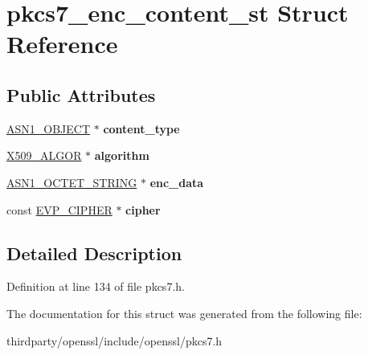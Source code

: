 \hypertarget{structpkcs7__enc__content__st}{}\section{pkcs7\+\_\+enc\+\_\+content\+\_\+st Struct Reference}
\label{structpkcs7__enc__content__st}
\subsection*{Public Attributes}
\begin{DoxyCompactItemize}
\item 
\mbox{\label{structpkcs7__enc__content__st_aae31932dd3ab5e4b1e54e9915f9c547c}} 
\hyperlink{structasn1__object__st}{A\+S\+N1\+\_\+\+O\+B\+J\+E\+CT} $\ast$ {\bfseries content\+\_\+type}
\item 
\mbox{\label{structpkcs7__enc__content__st_af6c78a84b4ca86334dfc04a072ce1117}} 
\hyperlink{struct_x509__algor__st}{X509\+\_\+\+A\+L\+G\+OR} $\ast$ {\bfseries algorithm}
\item 
\mbox{\label{structpkcs7__enc__content__st_ab4d08c0f1b94885ea0d0380ef4745c7b}} 
\hyperlink{structasn1__string__st}{A\+S\+N1\+\_\+\+O\+C\+T\+E\+T\+\_\+\+S\+T\+R\+I\+NG} $\ast$ {\bfseries enc\+\_\+data}
\item 
\mbox{\label{structpkcs7__enc__content__st_abb4444669fdf67803367ebddf34b8aff}} 
const \hyperlink{structevp__cipher__st}{E\+V\+P\+\_\+\+C\+I\+P\+H\+ER} $\ast$ {\bfseries cipher}
\end{DoxyCompactItemize}


\subsection{Detailed Description}


Definition at line 134 of file pkcs7.\+h.



The documentation for this struct was generated from the following file\+:\begin{DoxyCompactItemize}
\item 
thirdparty/openssl/include/openssl/pkcs7.\+h\end{DoxyCompactItemize}
